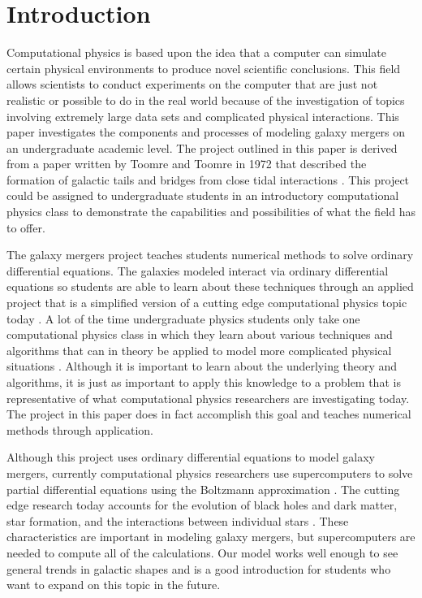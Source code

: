 \documentclass[11pt]{article}
\begin{document}
\section{Introduction} 

Computational physics is based upon the idea that a computer can simulate certain physical environments to produce novel scientific conclusions.  This field allows scientists to conduct experiments on the computer that are just not realistic or possible to do in the real world because of the investigation of topics involving extremely large data sets and complicated physical interactions\cite{Hjorth2008}.  This paper investigates the components and processes of modeling galaxy mergers on an undergraduate academic level.  The project outlined in this paper is derived from a paper written by Toomre and Toomre in 1972 that described the formation of galactic tails and bridges from close tidal interactions \cite{Toomre1972}. This project could be assigned to undergraduate students in an introductory computational physics class to demonstrate the capabilities and possibilities of what the field has to offer.  

The galaxy mergers project teaches students numerical methods to solve ordinary differential equations.  The galaxies modeled interact via ordinary differential equations so students are able to learn about these techniques through an applied project that is a simplified version of a cutting edge computational physics topic today \cite{Chilingarian2010}.  A lot of the time undergraduate physics students only take one computational physics class in which they learn about various techniques and algorithms that can in theory be applied to model more complicated physical situations \cite{Caballero2013}.  Although it is important to learn about the underlying theory and algorithms, it is just as important to apply this knowledge to a problem that is representative of what computational physics researchers are investigating today.  The project in this paper does in fact accomplish this goal and teaches numerical methods through application.

Although this project uses ordinary differential equations to model galaxy mergers, currently computational physics researchers use supercomputers to solve partial differential equations using the Boltzmann approximation \cite{Springel2005}.  The cutting edge research today accounts for the evolution of black holes and dark matter, star formation, and the interactions between individual stars \cite{Hung2013,Saitoh2009,Barnes1998,Bournaud2005}.  These characteristics are important in modeling galaxy mergers, but supercomputers are needed to compute all of the calculations.  Our model works well enough to see general trends in galactic shapes and is a good introduction for students who want to expand on this topic in the future.
\end{document}
